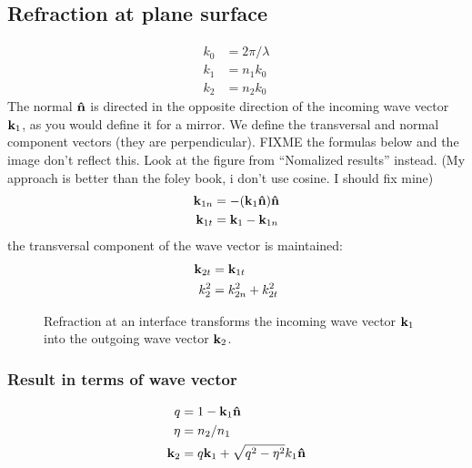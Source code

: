 \documentclass[twocolumn,DIV19]{scrartcl}
\begin{document}
\subsection{Refraction at plane surface}
\begin{align}
  k_0&=2\pi/\lambda\\
  k_1&=n_1 k_0\\
  k_2&=n_2 k_0
\end{align}
The normal $\mathbf{\hat{n}}$ is directed in the opposite direction of the incoming
wave vector $\mathbf{k}_1$, as you would define it for a mirror. We define the
transversal and normal component vectors (they are perpendicular). FIXME the formulas below and the image don't reflect this. Look at the figure from ``Nomalized results'' instead. (My approach is better than the foley book, i don't use cosine. I should fix mine)
\begin{align}
  \mathbf{k}_{1n}&=-(\mathbf{k}_1\mathbf{\hat{n}})\mathbf{\hat{n}}\\ 
  \mathbf{k}_{1t}&=\mathbf{k}_1 - \mathbf{k}_{1n}
\end{align}
the transversal component of the wave vector is maintained:
\begin{align}
  \mathbf{k}_{2t}&=\mathbf{k}_{1t}\\
  k_2^2&=k_{2n}^2 + k_{2t}^2
\end{align}

 \begin{figure}
   \centering
   
   \caption{Refraction at an interface transforms the incoming wave
     vector $\mathbf{k}_1$ into the outgoing wave vector $\mathbf{k}_2$.}
 \end{figure}

\subsubsection{Result in terms of wave vector}
\begin{align}
  q &= 1-\mathbf{k}_1 \mathbf{\hat{n}}\\
  \eta &= n_2/n_1\\
  \mathbf{k}_2 &= q \mathbf{k}_1 + \sqrt{q^2-\eta^2} k_1\mathbf{\hat{n}}
\end{align}
\end{document}
